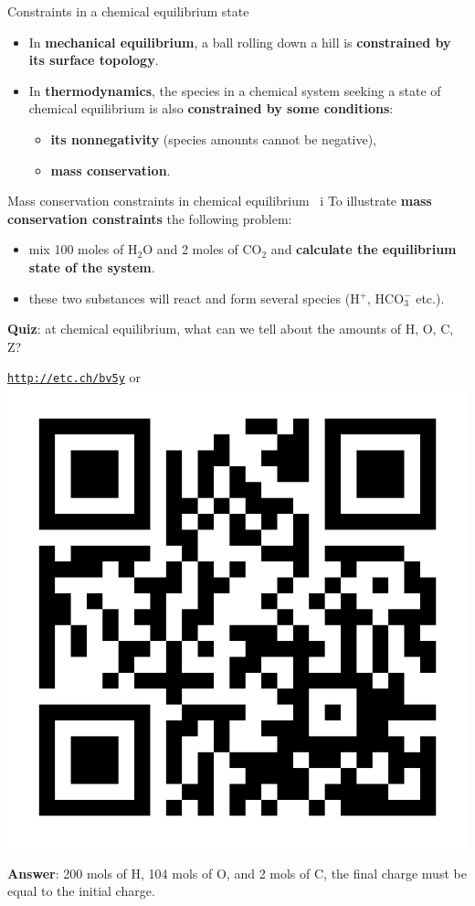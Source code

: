 %
\begin{frame}{Constraints in a chemical equilibrium state}
\begin{itemize}
\item In \alert{\textbf{mechanical equilibrium}}, a ball rolling down a hill is \textbf{constrained by its surface topology}. 
\pause
\item In \textbf{thermodynamics}, the species in a chemical system seeking a state of chemical
equilibrium is also \textbf{constrained by some conditions}: 
\begin{itemize}
\item \textbf{its nonnegativity} (species amounts cannot be negative),
\item \alert{\textbf{mass conservation}}.
\end{itemize}
\end{itemize}
\end{frame}
%
%
%
\begin{frame}{Mass conservation constraints in chemical equilibrium \, i}
%
\vskip 10pt
To illustrate \alert{\textbf{mass conservation constraints}} the following problem: 
\begin{itemize}
\item mix 100 moles of H$_{2}$O and 2 moles of CO$_{2}$
and \textbf{calculate the equilibrium state of the system}. 
\item these two substances will react and form several species (H$^{+}$,
HCO$_{3}^{-}$ etc.).
\end{itemize}
\hiddenpause
\alert{\textbf{Quiz}}: at chemical equilibrium, what can we tell about 
the amounts of H, O, C, Z?

\begin{center}
\href{http://etc.ch/bv5y}{\textcolor{indigo(dye)}{\tt http://etc.ch/bv5y}} 
\quad
or 
\quad
\includegraphics[height=0.21\columnwidth]{figures/chemical-equilibrium/poll.png}
\end{center}

\hiddenpause
\textbf{Answer}: 200 mols of H, 104 mols of O, and 2 mols of C,  the final charge must be equal to the initial charge. 
\end{frame}
